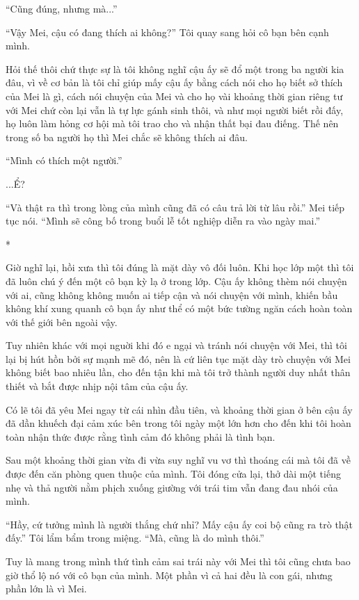 {``Cũng đúng, nhưng mà...''

``Vậy Mei, cậu có đang thích ai không?'' Tôi quay sang hỏi cô bạn bên
cạnh mình.

Hỏi thế thôi chứ thực sự là tôi không nghĩ cậu ấy sẽ đổ một trong ba
người kia đâu, vì về cơ bản là tôi chỉ giúp mấy cậu ấy bằng cách nói cho
họ biết sở thích của Mei là gì, cách nói chuyện của Mei và cho họ vài
khoảng thời gian riêng tư với Mei chứ còn lại vẫn là tự lực gánh sinh
thôi, và như mọi người biết rồi đấy, họ luôn làm hỏng cơ hội mà tôi trao
cho và nhận thất bại đau điếng. Thế nên trong số ba người họ thì Mei
chắc sẽ không thích ai đâu.

``Mình có thích một người.''

...Ể?

``Và thật ra thì trong lòng của mình cũng đã có câu trả lời từ lâu
rồi.'' Mei tiếp tục nói. ``Mình sẽ công bố trong buổi lễ tốt nghiệp diễn
ra vào ngày mai.''

*

Giờ nghĩ lại, hồi xưa thì tôi đúng là mặt dày vô đối luôn. Khi học lớp
một thì tôi đã luôn chú ý đến một cô bạn kỳ lạ ở trong lớp. Cậu ấy không
thèm nói chuyện với ai, cũng không không muốn ai tiếp cận và nói chuyện
với mình, khiến bầu không khí xung quanh cô bạn ấy như thể có một bức
tường ngăn cách hoàn toàn với thế giới bên ngoài vậy.

Tuy nhiên khác với mọi nguời khi đó e ngại và tránh nói chuyện với Mei,
thì tôi lại bị hút hồn bởi sự mạnh mẽ đó, nên là cứ liên tục mặt dày trò
chuyện với Mei không biết bao nhiêu lần, cho đến tận khi mà tôi trở
thành người duy nhất thân thiết và bắt được nhịp nội tâm của cậu ấy.

Có lẽ tôi đã yêu Mei ngay từ cái nhìn đầu tiên, và khoảng thời gian ở
bên cậu ấy đã dần khuếch đại cảm xúc bên trong tôi ngày một lớn hơn cho
đến khi tôi hoàn toàn nhận thức được rằng tình cảm đó không phải là tình
bạn.

Sau một khoảng thời gian vừa đi vừa suy nghĩ vu vơ thì thoáng cái mà tôi
đã về được đến căn phòng quen thuộc của mình. Tôi đóng cửa lại, thở dài
một tiếng nhẹ và thả người nằm phịch xuống giường với trái tim vẫn đang
đau nhói của mình.

``Hầy, cứ tưởng mình là người thắng chứ nhỉ? Mấy cậu ấy coi bộ cũng ra
trò thật đấy.'' Tôi lẩm bẩm trong miệng. ``Mà, cũng là do mình thôi.''

Tuy là mang trong mình thứ tình cảm sai trái này với Mei thì tôi cũng
chưa bao giờ thổ lộ nó với cô bạn của mình. Một phần vì cả hai đều là
con gái, nhưng phần lớn là vì Mei.

}
